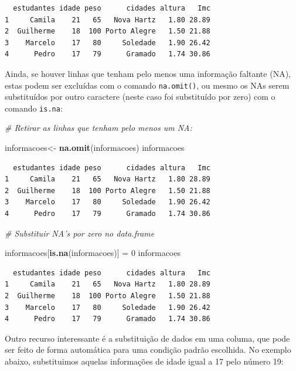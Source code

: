 \documentclass[12pt,brazil,]{book}
\newenvironment{Shaded}{\begin{snugshade}}{\end{snugshade}}
\newcommand{\CommentTok}[1]{\textcolor[rgb]{0.56,0.35,0.01}{\textit{#1}}}
\newcommand{\DecValTok}[1]{\textcolor[rgb]{0.00,0.00,0.81}{#1}}
\newcommand{\KeywordTok}[1]{\textcolor[rgb]{0.13,0.29,0.53}{\textbf{#1}}}
\newcommand{\NormalTok}[1]{#1}
\newcommand{\StringTok}[1]{\textcolor[rgb]{0.31,0.60,0.02}{#1}}
\begin{document}
\begin{verbatim}
  estudantes idade peso      cidades altura   Imc
1     Camila    21   65   Nova Hartz   1.80 28.89
2  Guilherme    18  100 Porto Alegre   1.50 21.88
3    Marcelo    17   80     Soledade   1.90 26.42
4      Pedro    17   79      Gramado   1.74 30.86
\end{verbatim}

Ainda, se houver linhas que tenham pelo menos uma informação faltante
(NA), estas podem ser excluídas com o comando \texttt{na.omit()}, ou
mesmo os NAs serem substituídos por outro caractere (neste caso foi
substituído por zero) com o comando \texttt{is.na}:

\begin{Shaded}
\begin{Highlighting}[]
\CommentTok{# Retirar as linhas que tenham pelo menos um NA:}

\NormalTok{informacoes<-}\StringTok{ }\KeywordTok{na.omit}\NormalTok{(informacoes)}
\NormalTok{informacoes}
\end{Highlighting}
\end{Shaded}

\begin{verbatim}
  estudantes idade peso      cidades altura   Imc
1     Camila    21   65   Nova Hartz   1.80 28.89
2  Guilherme    18  100 Porto Alegre   1.50 21.88
3    Marcelo    17   80     Soledade   1.90 26.42
4      Pedro    17   79      Gramado   1.74 30.86
\end{verbatim}

\begin{Shaded}
\begin{Highlighting}[]
\CommentTok{# Substituir NA's por zero no data.frame}

\NormalTok{informacoes[}\KeywordTok{is.na}\NormalTok{(informacoes)] =}\StringTok{ }\DecValTok{0}
\NormalTok{informacoes}
\end{Highlighting}
\end{Shaded}

\begin{verbatim}
  estudantes idade peso      cidades altura   Imc
1     Camila    21   65   Nova Hartz   1.80 28.89
2  Guilherme    18  100 Porto Alegre   1.50 21.88
3    Marcelo    17   80     Soledade   1.90 26.42
4      Pedro    17   79      Gramado   1.74 30.86
\end{verbatim}

Outro recurso interessante é a substituição de dados em uma columa, que
pode ser feito de forma automática para uma condição padrão escolhida.
No exemplo abaixo, substituimos aquelas informações de idade igual a 17
pelo número 19:
\end{document}
